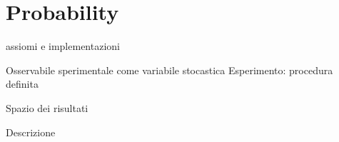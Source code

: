 \section{Probability}

\begin{frame}{assiomi e implementazioni}
\begin{block}{Osservabile sperimentale come variabile stocastica}
Esperimento: procedura definita
\end{block}

\begin{block}{Spazio dei risultati}

\end{block}



\end{frame}

\begin{wordonframe}{Descrizione}

\end{wordonframe}


